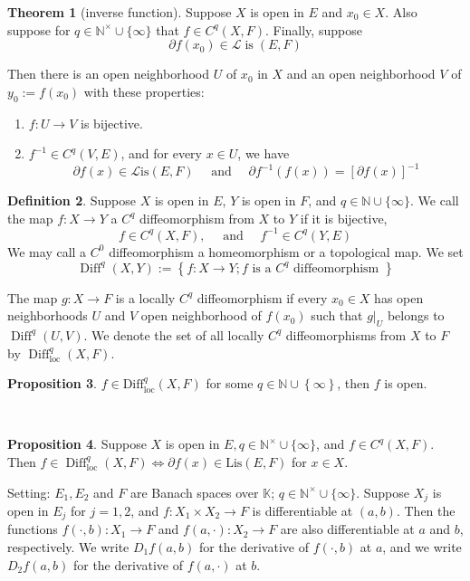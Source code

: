 \documentclass[12pt,a4paper]{book}
\newenvironment{prooff}{{\noindent\it\textcolor{cyan!40!black}{Proof}:}\,}{\par}
\newcommand{\bbrace}[1]{\left\{ #1 \right\} }
\newcommand{\bb}[1]{\mathbb{#1}}
\newenvironment{enu}{\begin{enumerate}[(1)]}{\end{enumerate}}
\theoremstyle{definition}
\newtheorem{defn}{Definition}[section]
\newtheorem{theo}[defn]{Theorem}
\newtheorem{prop}[defn]{Proposition}
\begin{document}
\begin{theo}[inverse function]
    Suppose $X$ is open in $E$ and $x_0 \in X$. Also suppose for $q \in \mathbb{N}^{\times} \cup\{\infty\}$ that $f \in C^q(X, F)$. Finally, suppose
    $$
    \partial f\left(x_0\right) \in \mathcal{L} \operatorname{is}(E, F)
    $$
    
    Then there is an open neighborhood $U$ of $x_0$ in $X$ and an open neighborhood $V$ of $y_0:=f\left(x_0\right)$ with these properties:
\begin{enu}
    \item $f: U \rightarrow V$ is bijective.
    \item $f^{-1} \in C^q(V, E)$, and for every $x \in U$, we have
    $$
    \partial f(x) \in \mathcal{L} \mathrm{is}(E, F) \quad \text { and } \quad \partial f^{-1}(f(x))=[\partial f(x)]^{-1}
    $$
\end{enu}
\end{theo}
\begin{defn}
    Suppose $X$ is open in $E$, $Y$ is open in $F$, and $q \in \mathbb{N} \cup\{\infty\}$. We call the map $f: X \rightarrow Y$ a $C^q$ diffeomorphism from $X$ to $Y$ if it is bijective,
    $$
    f \in C^q(X, F), \quad \text { and } \quad f^{-1} \in C^q(Y, E)
    $$
    We may call a $C^0$ diffeomorphism a homeomorphism or a topological map. We set
    $$
    \operatorname{Diff}^q(X, Y):=\left\{f: X \rightarrow Y ; f \text { is a } C^q \text { diffeomorphism }\right\}
    $$
    
    The map $g: X \rightarrow F$ is a locally $C^q$ diffeomorphism if every $x_0 \in X$ has open neighborhoods $U$ and $V$ open neighborhood of $f(x_0)$ such that 
    $g\left.\right|_U$ belongs to $\operatorname{Diff}^q(U, V)$. We denote the set of all locally $C^q$ diffeomorphisms from $X$ to $F$ by $\operatorname{Diff}_{\text {loc}}^q(X, F)$.
\end{defn}
\begin{prop}
    $f\in \text{Diff}_{\text{loc}}^q(X,F)$ for 
    some $q\in \bb{N}\cup\bbrace{\infty}$, then $f$ is open. 
\end{prop}
\begin{prooff}
    
\end{prooff}


\begin{prop}
    Suppose $X$ is open in $E, q \in \mathbb{N}^{\times} \cup\{\infty\}$, and $f \in C^q(X, F)$. Then $f \in \operatorname{Diff}_{\mathrm{loc}}^q(X, F) \Leftrightarrow \partial f(x) \in \text{Lis}(E, F)$ for $x \in X$.
\end{prop}
Setting: 
$E_1, E_2$ and $F$ are Banach spaces over $\mathbb{K}$; $q \in \mathbb{N}^{\times} \cup\{\infty\}$.
Suppose $X_j$ is open in $E_j$ for $j=1,2$, and $f: X_1 \times X_2 \rightarrow F$ is differentiable at $(a, b)$. Then the functions $f(\cdot, b): X_1 \rightarrow F$ and $f(a, \cdot): X_2 \rightarrow F$ are also
differentiable at $a$ and $b$, respectively. We write $D_1 f(a, b)$ for the derivative of $f(\cdot, b)$ at $a$, and we write $D_2 f(a, b)$ for the derivative of $f(a, \cdot)$ at $b$.
\end{document}
